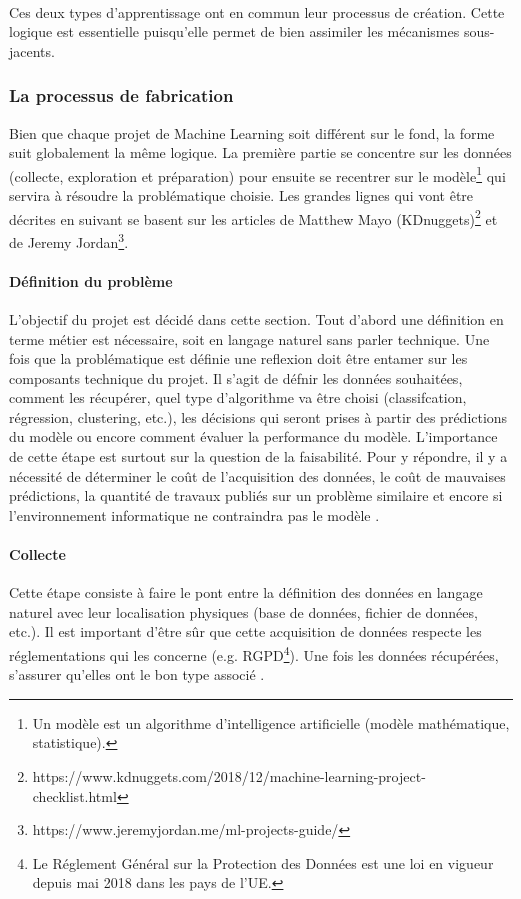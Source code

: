 \documentclass[10pt, french, a4paper]{article}
\begin{document}
\paragraph{}
Ces deux types d'apprentissage ont en commun leur processus de création. Cette logique est essentielle puisqu'elle permet de bien assimiler les mécanismes sous-jacents.

\subsubsection{La processus de fabrication}

Bien que chaque projet de Machine Learning soit différent sur le fond, la forme suit globalement la même logique. La première partie se concentre sur les données (collecte, exploration et préparation) pour ensuite se recentrer sur le modèle\footnote{Un modèle est un algorithme d’intelligence artificielle (modèle mathématique, statistique).} qui servira à résoudre la problématique choisie. Les grandes lignes qui vont être décrites en suivant se basent sur les articles de Matthew Mayo (KDnuggets)\footnote{https://www.kdnuggets.com/2018/12/machine-learning-project-checklist.html} et de Jeremy Jordan\footnote{https://www.jeremyjordan.me/ml-projects-guide/}.

\paragraph{Définition du problème}
L'objectif du projet est décidé dans cette section. Tout
d'abord une définition en terme métier est nécessaire, soit en langage naturel sans parler technique. Une fois que la problématique est définie une reflexion doit être entamer sur les composants technique du projet. Il s'agit de défnir les données souhaitées, comment les récupérer, quel type d'algorithme va être choisi (classifcation, régression, clustering, etc.), les décisions qui seront prises à partir des prédictions du modèle ou encore comment évaluer la performance du modèle. L'importance de cette étape est surtout sur la question de la faisabilité. Pour y répondre, il y a nécessité de déterminer le coût de l'acquisition des données, le coût de mauvaises prédictions, la quantité de travaux publiés sur un problème similaire et encore si l'environnement informatique ne contraindra pas le modèle \citep{jordan_organizing_2018}.

\paragraph{Collecte}
Cette étape consiste à faire le pont entre la définition des données en langage naturel avec leur localisation physiques (base de données, fichier de données, etc.). Il est important d'être sûr que cette acquisition de données respecte les réglementations qui les concerne (e.g. RGPD\footnote{Le Réglement Général sur la Protection des Données est une loi en vigueur depuis mai 2018 dans les pays de l'UE.}). Une fois les données récupérées, s'assurer qu'elles ont le bon type associé \citep{mayo_machine_2018}.
\end{document}
